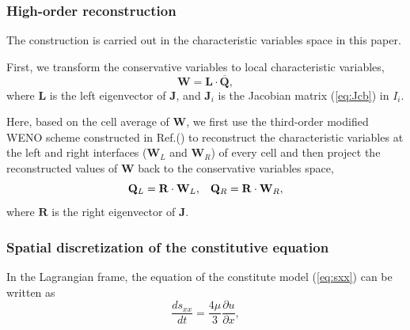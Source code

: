 \documentclass[review]{elsarticle}
\begin{document}
\subsubsection{High-order reconstruction}\label{hor}
The construction is carried out in the characteristic variables  space in this paper.

First, we transform the conservative variables to local characteristic variables,
\begin{equation}\label{eq:chaVar}
  \mathbf{W} = \mathbf{L} \cdot \overline{\mathbf{Q}},
\end{equation}
where $\mathbf{L}$ is the left eigenvector of $\mathbf{J}$, and $\mathbf{J}_i$ is the Jacobian matrix  (\ref{eq:Jcb}) in $I_i$.

Here, based on the cell average of $\mathbf{W}$, we  first use the third-order modified WENO scheme constructed in Ref.(\cite{liu2018novel}) to reconstruct the characteristic variables at the  left and right interfaces ($\mathbf{W}_L$ and $\mathbf{W}_R$)  of every cell and then project the reconstructed values of $\mathbf{W}$ back to the conservative variables space,
\begin{equation}
  \mathbf{Q}_L = \mathbf{R} \cdot \mathbf{W}_L, \hspace{0.3cm}   \mathbf{Q}_R = \mathbf{R} \cdot \mathbf{W}_R,
\end{equation}
where $\mathbf{R}$ is the right eigenvector of $\mathbf{J}$.

\subsubsection{Spatial discretization of the constitutive equation}
In the Lagrangian frame, the equation of the constitute model (\ref{eq:sxx}) can be written as
\begin{equation}
  \frac{ds_{xx}}{dt} = \frac{4\mu }{3} \frac{\partial u}{\partial x},
\end{equation}
\end{document}
